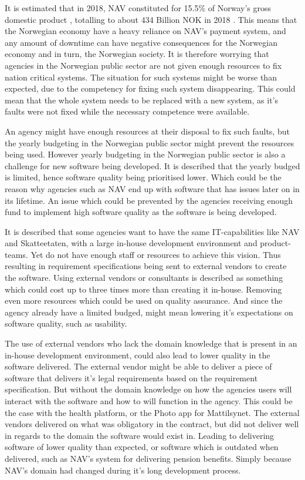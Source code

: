 It is estimated that in 2018, NAV constituted for 15.5\% of Norway's gross domestic product \cite{nav_ytelsene_frem_mot_2060_2019}, totalling to about 434 Billion NOK in 2018 \cite{faktaark_finansdepartementet_2020}. This means that the Norwegian economy have a heavy reliance on NAV's payment system, and any amount of downtime can have negative consequences for the Norwegian economy and in turn, the Norwegian society. It is therefore worrying that agencies in the Norwegian public sector are not given enough resources to fix nation critical systems. The situation for such systems might be worse than expected, due to the competency for fixing such system disappearing. This could mean that the whole system needs to be replaced with a new system, as it's faults were not fixed while the necessary competence were available.

An agency might have enough resources at their disposal to fix such faults, but the yearly budgeting in the Norwegian public sector might prevent the resources being used. However yearly budgeting in the Norwegian public sector is also a challenge for new software being developed. It is described that the yearly budged is limited, hence software quality being prioritised lower. Which could be the reason why agencies such as NAV end up with software that has issues later on in its lifetime. An issue which could be prevented by the agencies receiving enough fund to implement high software quality as the software is being developed.

It is described that some agencies want to have the same IT-capabilities like NAV and Skatteetaten, with a large in-house development environment and product-teams. Yet do not have enough staff or resources to achieve this vision. Thus resulting in requirement specifications being sent to external vendors to create the software. Using external vendors or consultants is described as something which could cost up to three times more than creating it in-house. Removing even more resources which could be used on quality assurance. And since the agency already have a limited budged, might mean lowering it's expectations on software quality, such as usability.

The use of external vendors who lack the domain knowledge that is present in an in-house development environment, could also lead to lower quality in the software delivered. The external vendor might be able to deliver a piece of software that delivers it's legal requirements based on the requirement specification. But without the domain knowledge on how the agencies users will interact with the software and how to will function in the agency. This could be the case with the health platform, or the Photo app for Mattilsynet. The external vendors delivered on what was obligatory in the contract, but did not deliver well in regards to the domain the software would exist in. Leading to delivering software of lower quality than expected, or software which is outdated when delivered, such as NAV's system for delivering pension benefits. Simply because NAV's domain had changed during it's long development process.


